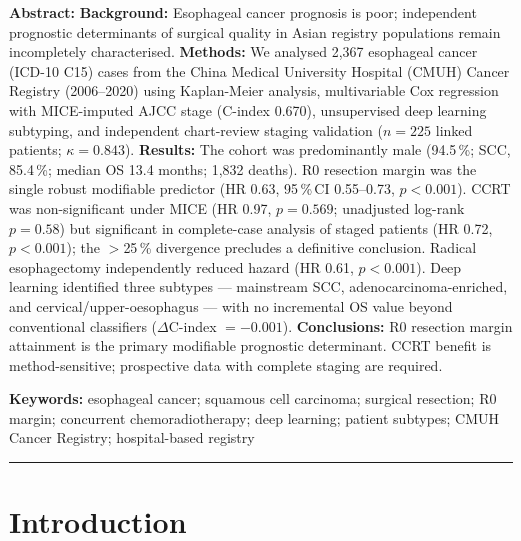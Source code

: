 \documentclass[12pt,a4paper]{article}
\begin{document}
\begin{titlepage}
\noindent\textbf{Abstract:}
\textbf{Background:} Esophageal cancer prognosis is poor; independent
prognostic determinants of surgical quality in Asian registry populations
remain incompletely characterised.
\textbf{Methods:} We analysed 2,367 esophageal cancer (ICD-10 C15)
cases from the China Medical University Hospital (CMUH) Cancer Registry (2006--2020) using Kaplan-Meier
analysis, multivariable Cox regression with MICE-imputed AJCC stage
(C-index 0.670), unsupervised deep learning subtyping, and independent
chart-review staging validation ($n = 225$ linked patients; $\kappa = 0.843$).
\textbf{Results:} The cohort was predominantly male (94.5\,\%; SCC,
85.4\,\%; median OS 13.4 months; 1,832 deaths). R0 resection margin
was the single robust modifiable predictor (HR 0.63, 95\,\%\,CI
0.55--0.73, $p < 0.001$). CCRT was non-significant under MICE
(HR 0.97, $p = 0.569$; unadjusted log-rank $p = 0.58$) but
significant in complete-case analysis of staged patients
(HR 0.72, $p < 0.001$); the $>$25\,\% divergence precludes a
definitive conclusion. Radical esophagectomy independently reduced
hazard (HR 0.61, $p < 0.001$). Deep learning identified three subtypes
--- mainstream SCC, adenocarcinoma-enriched, and
cervical/upper-oesophagus --- with no incremental OS value beyond
conventional classifiers ($\Delta$C-index $= -0.001$).
\textbf{Conclusions:} R0 resection margin attainment is the primary
modifiable prognostic determinant. CCRT benefit is method-sensitive;
prospective data with complete staging are required.

\vspace{0.5em}
\noindent\textbf{Keywords:} esophageal cancer; squamous cell carcinoma;
surgical resection; R0 margin; concurrent chemoradiotherapy; deep learning;
patient subtypes; CMUH Cancer Registry; hospital-based registry

\noindent\rule{\linewidth}{0.4pt}

\end{titlepage}

\section{Introduction}
\end{document}
